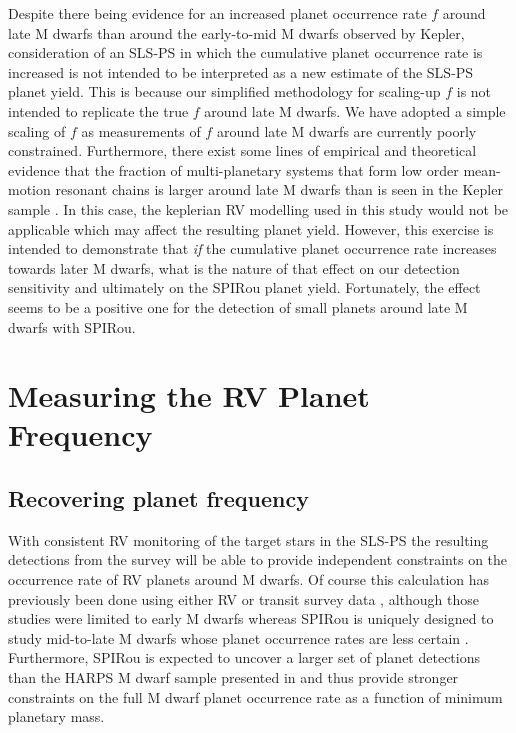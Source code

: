 Despite there being evidence for an increased planet occurrence rate $f$ around late M dwarfs
than around the early-to-mid M dwarfs observed by Kepler, consideration of an SLS-PS
in which the cumulative planet occurrence rate is increased is not intended to be
interpreted as a new estimate of the SLS-PS planet yield. This is because our simplified
methodology for scaling-up $f$ is not intended to replicate the true $f$ around late M
dwarfs. We have adopted a simple scaling of $f$ as measurements
of $f$ around late M dwarfs are currently poorly constrained. Furthermore, there exist
some lines of empirical and theoretical evidence \citep{gillon17, pan17}
that the fraction of multi-planetary systems that
form low order mean-motion resonant chains is larger around late M dwarfs than is seen in the
Kepler sample \citep{lissauer11, fabrycky14}. In this case, the keplerian RV modelling used
in this study would not be applicable which may affect the resulting planet yield.
However, this exercise is intended to demonstrate that \emph{if} the cumulative planet occurrence
rate increases towards later M dwarfs, what is the nature of that effect
on our detection sensitivity and ultimately on the SPIRou planet yield.
Fortunately, the effect seems to be a positive
one for the detection of small planets around late M dwarfs with SPIRou.

\section{Measuring the RV Planet Frequency} \label{BSsect:measurements}
\subsection{Recovering planet frequency} \label{BSsect:occurrence}
With consistent RV monitoring of the target stars in the SLS-PS the resulting detections
from the survey will be able to provide independent constraints on the occurrence rate of
RV planets around M dwarfs.
Of course this calculation has previously been done using either
RV or transit survey data \citep[e.g.][]{bonfils13, dressing15a},
although those studies were limited to early M dwarfs whereas SPIRou is uniquely designed
to study mid-to-late M dwarfs whose planet occurrence rates are less certain \citep{demory16}.
Furthermore,
SPIRou is expected to uncover a larger set of planet detections than the HARPS M dwarf sample
presented in \cite{bonfils13} and thus provide stronger constraints on the full M dwarf planet
occurrence rate as a function of minimum planetary mass.

